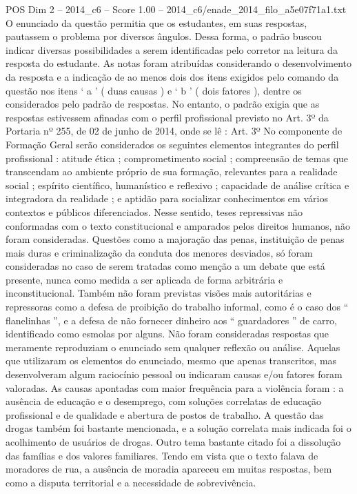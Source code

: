 \begin{textsample}{POS Dim 2 – 2014\_c6 – Score 1.00 – 2014\_c6/enade\_2014\_filo\_a5e07f71a1.txt}
O enunciado da questão permitia que os estudantes, em suas respostas, pautassem o problema por diversos ângulos.
Dessa forma, o padrão buscou indicar diversas possibilidades a serem identificadas pelo corretor na leitura da resposta do estudante.
As notas foram atribuídas considerando o desenvolvimento da resposta e a indicação de ao menos dois dos itens exigidos pelo comando da questão nos itens ‘ a ’ ( duas causas ) e ‘ b ’ ( dois fatores ), dentre os considerados pelo padrão de respostas.
No entanto, o padrão exigia que as respostas estivessem afinadas com o perfil profissional previsto no Art. 3º da Portaria nº 255, de 02 de junho de 2014, onde se lê : Art. 3º No componente de Formação Geral serão considerados os seguintes elementos integrantes do perfil profissional : atitude ética ; comprometimento social ; compreensão de temas que transcendam ao ambiente próprio de sua formação, relevantes para a realidade social ; espírito científico, humanístico e reflexivo ; capacidade de análise crítica e integradora da realidade ; e aptidão para socializar conhecimentos em vários contextos e públicos diferenciados.
Nesse sentido, teses repressivas não conformadas com o texto constitucional e amparados pelos direitos humanos, não foram consideradas.
Questões como a majoração das penas, instituição de penas mais duras e criminalização da conduta dos menores desviados, só foram consideradas no caso de serem tratadas como menção a um debate que está presente, nunca como medida a ser aplicada de forma arbitrária e inconstitucional.
Também não foram previstas visões mais autoritárias e repressoras como a defesa de proibição do trabalho informal, como é o caso dos “ flanelinhas ”, e a defesa de não fornecer dinheiro aos “ guardadores ” de carro, identificado como esmolas por alguns.
Não foram consideradas respostas que meramente reproduziam o enunciado sem qualquer reflexão ou análise.
Aquelas que utilizaram os elementos do enunciado, mesmo que apenas transcritos, mas desenvolveram algum raciocínio pessoal ou indicaram causas e/ou fatores foram valoradas.
As causas apontadas com maior frequência para a violência foram : a ausência de educação e o desemprego, com soluções correlatas de educação profissional e de qualidade e abertura de postos de trabalho.
A questão das drogas também foi bastante mencionada, e a solução correlata mais indicada foi o acolhimento de usuários de drogas.
Outro tema bastante citado foi a dissolução das famílias e dos valores familiares.
Tendo em vista que o texto falava de moradores de rua, a ausência de moradia apareceu em muitas respostas, bem como a disputa territorial e a necessidade de sobrevivência.

\end{textsample}
